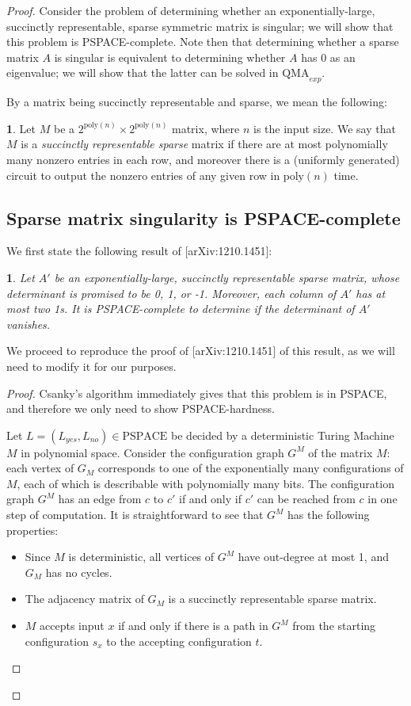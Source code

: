 \documentclass[english]{article}
\numberwithin{equation}{section}
\numberwithin{figure}{section}
\theoremstyle{plain}
\theoremstyle{definition}
\newtheorem{defn}[thm]{\protect\definitionname}
\theoremstyle{plain}
\newtheorem{lem}[thm]{\protect\lemmaname}
\theoremstyle{definition}
\theoremstyle{remark}
\theoremstyle{remark}
\theoremstyle{plain}
\providecommand{\definitionname}{Definition}
\providecommand{\lemmaname}{Lemma}
\begin{document}
\begin{proof}

Consider the problem of determining whether an exponentially-large, succinctly representable, sparse symmetric matrix is singular; we will show that this problem is PSPACE-complete. Note then that determining whether a sparse matrix $A$ is singular is equivalent to determining whether $A$ has 0 as an eigenvalue; we will show that the latter can be solved in $\text{QMA}_{exp}$.

By a matrix being succinctly representable and sparse, we mean the following:
\begin{defn}
Let $M$ be a $2^{\text{poly}(n)} \times 2^{\text{poly}(n)}$ matrix, where $n$ is the input size. We say that $M$ is a \emph{succinctly representable sparse} matrix if there are at most polynomially many nonzero entries in each row, and moreover there is a (uniformly generated) circuit to output the nonzero entries of any given row in $\text{poly}(n)$ time.
\end{defn}

\subsection{Sparse matrix singularity is PSPACE-complete}

We first state the following result of [arXiv:1210.1451]:
\begin{lem}
Let $A'$ be an exponentially-large, succinctly representable sparse matrix, whose determinant is promised to be 0, 1, or -1. Moreover, each column of $A'$ has at most two 1s. It is PSPACE-complete to determine if the determinant of $A'$ vanishes.
\end{lem}

We proceed to reproduce the proof of [arXiv:1210.1451] of this result, as we will need to modify it for our purposes.

\begin{proof}
Csanky's algorithm immediately gives that this problem is in PSPACE, and therefore we only need to show PSPACE-hardness.

Let $L=(L_{yes},L_{no}) \in \text{PSPACE}$ be decided by a deterministic Turing Machine $M$ in polynomial space. Consider the configuration graph $G^M$ of the matrix $M$: each vertex of $G_M$ corresponds to one of the exponentially many configurations of $M$, each of which is describable with polynomially many bits. The configuration graph $G^M$ has an edge from $c$ to $c'$ if and only if $c'$ can be reached from $c$ in one step of computation. It is straightforward to see that $G^M$ has the following properties:
\begin{itemize}
\item Since $M$ is deterministic, all vertices of $G^M$ have out-degree at most 1, and $G_M$ has no cycles.
\item The adjacency matrix of $G_M$ is a succinctly representable sparse matrix.
\item $M$ accepts input $x$ if and only if there is a path in $G^M$ from the starting configuration $s_x$ to the accepting configuration $t$.
\end{itemize}


\end{proof}
\end{proof}
\end{document}

